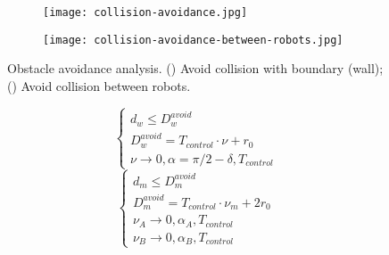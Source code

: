 \begin{figure}[h]
    \centering
    \begin{subfigure}{0.4\textwidth}
        \centering
        \texttt{[image: collision-avoidance.jpg]}
        \caption{\label{figure:Avoid collision with boundary}}
    \end{subfigure}
    \begin{subfigure}{0.4\textwidth}
        \centering
        \texttt{[image: collision-avoidance-between-robots.jpg]}
        \caption{\label{figure:Avoid collision between robots}}
    \end{subfigure}
    \caption{Obstacle avoidance analysis. () Avoid collision with boundary (wall); () Avoid collision between robots.}
    \label{figure:obstacle avoidance analysis}
\end{figure}
\begin{equation}\label{eq:configuration of robot movement parameters}
    \begin{cases}
        d_w\leq D_w^{avoid} \\
        D_w^{avoid} = T_{control}\cdot \nu +r_0 \\
        \nu \rightarrow 0, \alpha=\pi/2-\delta, T_{control}
    \end{cases}
\end{equation}
\begin{equation}\label{eq:configuration2 of robot movement parameters}
    \begin{cases}
        d_m\leq D_m^{avoid} \\
        D_m^{avoid} = T_{control}\cdot \nu_m + 2r_0 \\
        \nu_A \rightarrow 0, \alpha_A, T_{control} \\
        \nu_B \rightarrow 0, \alpha_B, T_{control}
    \end{cases}
\end{equation}

